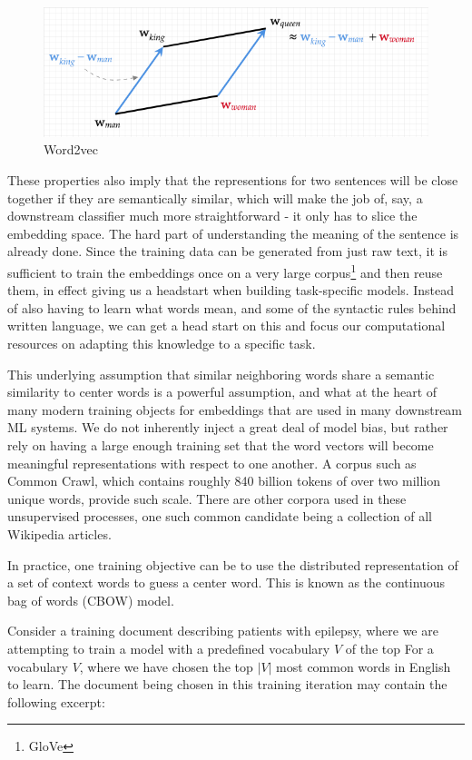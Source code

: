 \begin{figure}
  \includegraphics[width=\linewidth]{chapters/NLP/figures/king-man+woman.png}
  \caption{Word2vec}
  \label{fig:kingmanwoman}
\end{figure}
These properties also imply that the representions for two sentences will be close together if they are semantically similar, which will make the job of, say, a downstream classifier much more straightforward - it only has to slice the embedding space.
The hard part of understanding the meaning of the sentence is already done.
Since the training data can be generated from just raw text, it is sufficient to train the embeddings once on a very large corpus\footnote{GloVe} and then reuse them, in effect giving us a headstart when building task-specific models.
Instead of also having to learn what words mean, and some of the syntactic rules behind written language, we can get a head start on this and focus our computational resources on adapting this knowledge to a specific task.

This underlying assumption that similar neighboring words share a semantic similarity to center words is a powerful assumption, and what at the heart of many modern training objects for embeddings that are used in many downstream ML systems.
We do not inherently inject a great deal of model bias, but rather rely on having a large enough training set that the word vectors will become meaningful representations with respect to one another. A corpus such as Common Crawl, which
contains roughly 840 billion tokens of over two million unique words, provide such scale. There are other corpora used in these unsupervised processes, one such common candidate being a collection of all Wikipedia articles.

In practice, one training objective can be to use the distributed representation of a set of context words to guess a center word. This is known as the continuous bag of words (CBOW) model.

Consider a training document describing patients with epilepsy, where we are attempting to train a model with a predefined vocabulary $V$ of the top For a vocabulary $V$, where we have chosen the top $|V|$ most common words in English to learn.
The document being chosen in this training iteration may contain the following excerpt:

